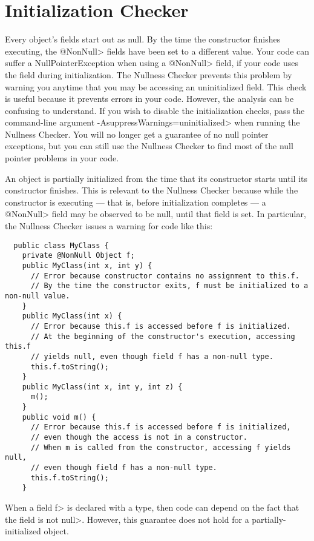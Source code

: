 \section{Initialization Checker\label{initialization-checker}}

Every object's fields start out as null.  By the time the constructor
finishes executing, the \<@NonNull> fields have been set to a different
value.  Your code can suffer a NullPointerException when using a
\<@NonNull> field, if your code uses the field during initialization.
The Nullness Checker prevents this problem by warning you anytime that you
may be accessing an uninitialized field.  This check is useful because it
prevents errors in your code.  However, the analysis can be confusing to
understand.  If you wish to disable the initialization checks, pass the
command-line argument \<-AsuppressWarnings=uninitialized> when running the
Nullness Checker.  You will no longer get a guarantee of no null pointer
exceptions, but you can still use the Nullness Checker to find most of the
null pointer problems in your code.


An object is partially initialized from the time that its constructor starts until its constructor
finishes.  This is relevant to the Nullness Checker because while the
constructor is executing --- that is, before initialization completes ---
a \<@NonNull>
field may be observed to be null, until that field is set.  In
particular, the Nullness Checker issues a warning for code like this:

\begin{Verbatim}
  public class MyClass {
    private @NonNull Object f;
    public MyClass(int x, int y) {
      // Error because constructor contains no assignment to this.f.
      // By the time the constructor exits, f must be initialized to a non-null value.
    }
    public MyClass(int x) {
      // Error because this.f is accessed before f is initialized.
      // At the beginning of the constructor's execution, accessing this.f
      // yields null, even though field f has a non-null type.
      this.f.toString();
    }
    public MyClass(int x, int y, int z) {
      m();
    }
    public void m() {
      // Error because this.f is accessed before f is initialized,
      // even though the access is not in a constructor.
      // When m is called from the constructor, accessing f yields null,
      // even though field f has a non-null type.
      this.f.toString();
    }
\end{Verbatim}

\noindent
When a field \<f> is declared with a 
type, then code can depend on the fact that the field is not \<null>.
However, this guarantee does not hold for a partially-initialized object.

